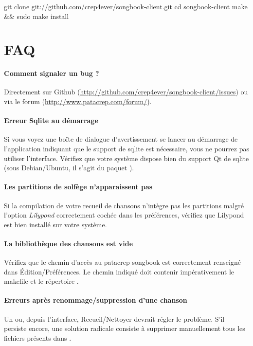 \begin{unix}
  git clone git://github.com/crep4ever/songbook-client.git
  cd songbook-client
  make && sudo make install
\end{unix}

\subsection{\windows}


\section{FAQ}

\paragraph{Comment signaler un bug ?}
Directement sur Github
(\url{http://github.com/crep4ever/songbook-client/issues}) ou via le
forum (\url{http://www.patacrep.com/forum/}).

\paragraph{Erreur Sqlite au démarrage} 
Si vous voyez une boîte de dialogue d'avertissement se lancer au
démarrage de l'application indiquant que le support de sqlite est
nécessaire, vous ne pourrez pas utiliser l'interface. Vérifiez que
votre système dispose bien du support Qt de sqlite (sous
Debian/Ubuntu, il s'agit du paquet ).

\paragraph{Les partitions de solfège n'apparaissent pas}
Si la compilation de votre recueil de chansons n'intègre pas les
partitions malgré l'option \emph{Lilypond} correctement cochée dans les
préférences, vérifiez que Lilypond est bien installé sur votre système. 

\paragraph{La bibliothèque des chansons est vide} 
Vérifiez que le chemin d'accès au patacrep songbook est correctement
renseigné dans Édition/Préférences.  Le chemin indiqué doit contenir
impérativement le makefile et le répertoire .

\paragraph{Erreurs après renommage/suppression d'une chanson} 
Un  ou, depuis l'interface, Recueil/Nettoyer devrait
régler le problème. S'il persiste encore, une solution radicale
consiste à supprimer manuellement tous les fichiers  présents
dans .
